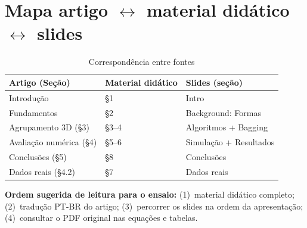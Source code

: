 \documentclass[12pt,a4paper]{article}
\begin{document}
\section{Mapa artigo $\leftrightarrow$ material didático $\leftrightarrow$ slides}

\begin{table}[h]
\centering
\caption{Correspondência entre fontes}
\small
\begin{tabular}{@{}lll@{}}
\toprule
\textbf{Artigo (Seção)} & \textbf{Material didático} & \textbf{Slides (seção)} \\
\midrule
Introdução & \S1 & Intro \\
Fundamentos & \S2 & Background: Formas \\
Agrupamento 3D (\S3) & \S3--4 & Algoritmos + Bagging \\
Avaliação numérica (\S4) & \S5--6 & Simulação + Resultados \\
Conclusões (\S5) & \S8 & Conclusões \\
Dados reais (\S4.2) & \S7 & Dados reais \\
\bottomrule
\end{tabular}
\end{table}

\vspace{1em}
\noindent
\textbf{Ordem sugerida de leitura para o ensaio:}
(1)~material didático completo;
(2)~tradução PT-BR do artigo;
(3)~percorrer os slides na ordem da apresentação;
(4)~consultar o PDF original nas equações e tabelas.
\end{document}
